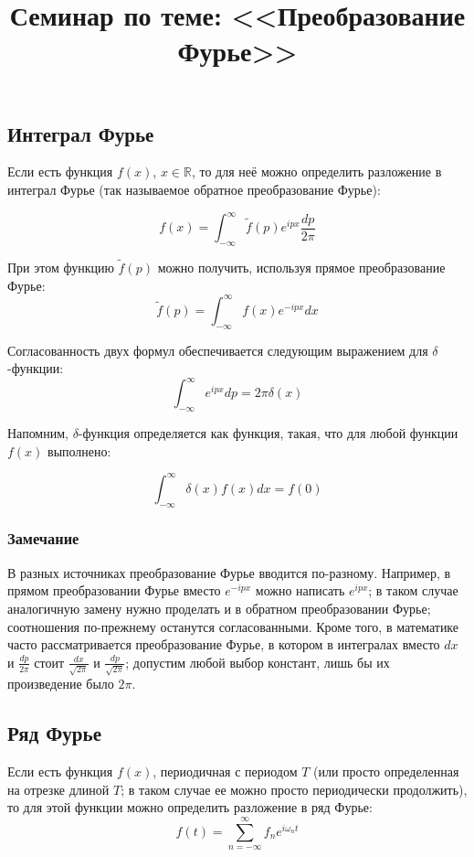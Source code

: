 \documentclass[a4paper,12pt]{article}
\begin{document}
\title{Семинар по теме: <<Преобразование Фурье>>}
\maketitle


\subsection*{Интеграл Фурье}

Если есть функция $f(x)$, $x\in\mathbb{R}$, то для неё можно определить
разложение в интеграл Фурье (так называемое обратное преобразование
Фурье):

\[
f\left(x\right)=\int_{-\infty}^{\infty}\tilde{f}(p)e^{ipx}\frac{dp}{2\pi}
\]


\noindent
При этом функцию $\tilde{f}\left(p\right)$ можно получить, используя
прямое преобразование Фурье:
\[
\tilde{f}(p)=\int_{-\infty}^{\infty}f(x)e^{-ipx}dx
\]


\noindent
Согласованность двух формул обеспечивается следующим выражением для
$\delta$-функции:
\[
\int_{-\infty}^{\infty}e^{ipx}dp=2\pi\delta\left(x\right)
\]


\noindent
Напомним, $\delta$-функция определяется как функция, такая, что для
любой функции $f(x)$ выполнено:

\[
\int_{-\infty}^{\infty}\delta(x)f(x)dx=f(0)
\]



\subsubsection*{Замечание}

В разных источниках преобразование Фурье вводится по-разному. Например,
в прямом преобразовании Фурье вместо $e^{-ipx}$ можно написать $e^{ipx}$;
в таком случае аналогичную замену нужно проделать и в обратном преобразовании
Фурье; соотношения по-прежнему останутся согласованными. Кроме того,
в математике часто рассматривается преобразование Фурье, в котором
в интегралах вместо $dx$ и $\frac{dp}{2\pi}$ стоит $\frac{dx}{\sqrt{2\pi}}$
и $\frac{dp}{\sqrt{2\pi}}$; допустим любой выбор констант, лишь бы
их произведение было $2\pi$.


\subsection*{Ряд Фурье}

Если есть функция $f(x)$, периодичная с периодом $T$ (или просто
определенная на отрезке длиной $T$; в таком случае ее можно просто
периодически продолжить), то для этой функции можно определить разложение
в ряд Фурье:
\[
f(t)=\sum_{n=-\infty}^{\infty}f_{n}e^{i\omega_{n}t}
\]
\end{document}
